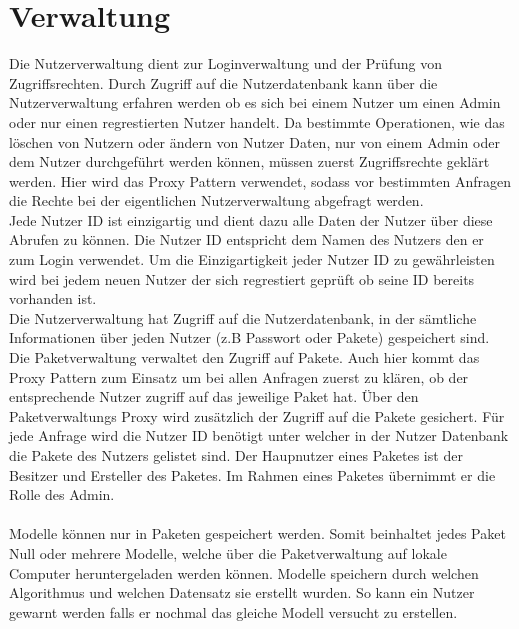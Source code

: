 \documentclass{book}
\begin{document}
\section{Verwaltung}
Die Nutzerverwaltung dient zur Loginverwaltung und der Prüfung von Zugriffsrechten. Durch Zugriff auf die 
Nutzerdatenbank kann über die Nutzerverwaltung erfahren werden ob es sich bei einem Nutzer um einen Admin oder
nur einen regrestierten Nutzer handelt. Da bestimmte Operationen, wie das löschen von Nutzern oder ändern von
Nutzer Daten, nur von einem Admin oder dem Nutzer  durchgeführt werden können, müssen zuerst Zugriffsrechte geklärt werden. Hier wird das Proxy Pattern verwendet, sodass vor bestimmten Anfragen die Rechte bei der eigentlichen Nutzerverwaltung abgefragt werden.\\
Jede Nutzer ID ist einzigartig und dient dazu alle Daten der Nutzer über diese Abrufen zu können. Die Nutzer ID entspricht dem Namen des Nutzers den er zum Login verwendet. Um die Einzigartigkeit jeder Nutzer ID zu gewährleisten wird bei jedem neuen Nutzer der sich regrestiert geprüft ob seine ID bereits vorhanden ist. \\
Die Nutzerverwaltung hat Zugriff auf die Nutzerdatenbank, in der sämtliche Informationen über jeden Nutzer (z.B Passwort oder Pakete) gespeichert sind.
\\
Die Paketverwaltung verwaltet den Zugriff auf Pakete. Auch hier kommt das Proxy Pattern zum Einsatz um bei allen Anfragen zuerst zu klären, ob der entsprechende Nutzer zugriff auf das jeweilige Paket hat. Über den Paketverwaltungs Proxy wird zusätzlich der Zugriff auf die Pakete gesichert. Für jede Anfrage wird die Nutzer ID benötigt unter welcher in der Nutzer Datenbank die Pakete des Nutzers gelistet sind.
Der Haupnutzer eines Paketes ist der Besitzer und Ersteller des Paketes. Im Rahmen eines Paketes übernimmt er die Rolle des Admin.\\
\\
Modelle können nur in Paketen gespeichert werden. Somit beinhaltet jedes Paket Null oder mehrere Modelle, welche über die Paketverwaltung auf lokale Computer heruntergeladen werden können.
Modelle speichern durch welchen Algorithmus und welchen Datensatz sie erstellt wurden. So kann ein Nutzer gewarnt werden falls er nochmal das gleiche Modell versucht zu erstellen.
\end{document}
